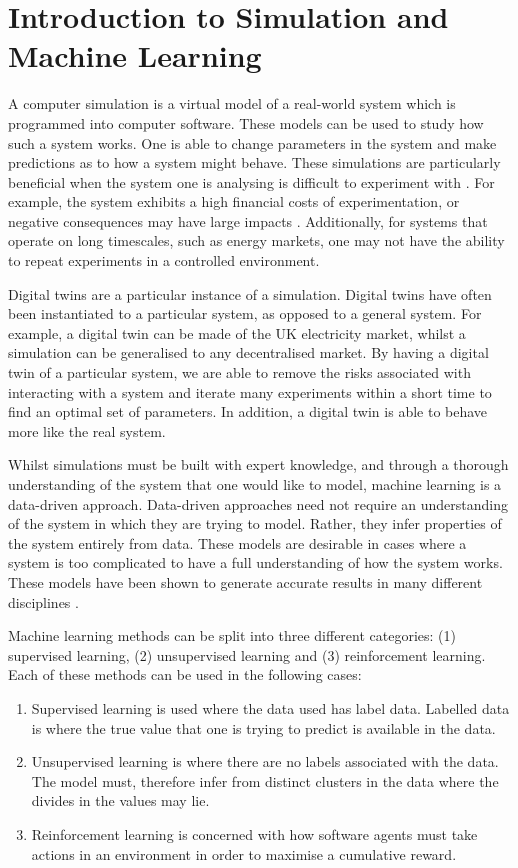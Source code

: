 \section{Introduction to Simulation and Machine Learning}
\label{sec:intro:simulationmodelling}

A computer simulation is a virtual model of a real-world system which is programmed into computer software. These models can be used to study how such a system works. One is able to change parameters in the system and make predictions as to how a system might behave. These simulations are particularly beneficial when the system one is analysing is difficult to experiment with \cite{fishman1978principles}. For example, the system exhibits a high financial costs of experimentation, or negative consequences may have large impacts \cite{mitrani1982simulation}. Additionally, for systems that operate on long timescales, such as energy markets, one may not have the ability to repeat experiments in a controlled environment.

Digital twins are a particular instance of a simulation. Digital twins have often been instantiated to a particular system, as opposed to a general system. For example, a digital twin can be made of the UK electricity market, whilst a simulation can be generalised to any decentralised market. By having a digital twin of a particular system, we are able to remove the risks associated with interacting with a system and iterate many experiments within a short time to find an optimal set of parameters. In addition, a digital twin is able to behave more like the real system.

Whilst simulations must be built with expert knowledge, and through a thorough understanding of the system that one would like to model, machine learning is a data-driven approach. Data-driven approaches need not require an understanding of the system in which they are trying to model. Rather, they infer properties of the system entirely from data. These models are desirable in cases where a system is too complicated to have a full understanding of how the system works. These models have been shown to generate accurate results in many different disciplines \cite{Covington2016,WarrenLiao2005,Wiens2009}.

Machine learning methods can be split into three different categories: (1) supervised learning, (2) unsupervised learning and (3) reinforcement learning. Each of these methods can be used in the following cases:

\begin{enumerate}
	\item Supervised learning is used where the data used has label data. Labelled data is where the true value that one is trying to predict is available in the data.
	\item Unsupervised learning is where there are no labels associated with the data. The model must, therefore infer from distinct clusters in the data where the divides in the values may lie.
	\item Reinforcement learning is concerned with how software agents must take actions in an environment in order to maximise a cumulative reward.
\end{enumerate}

